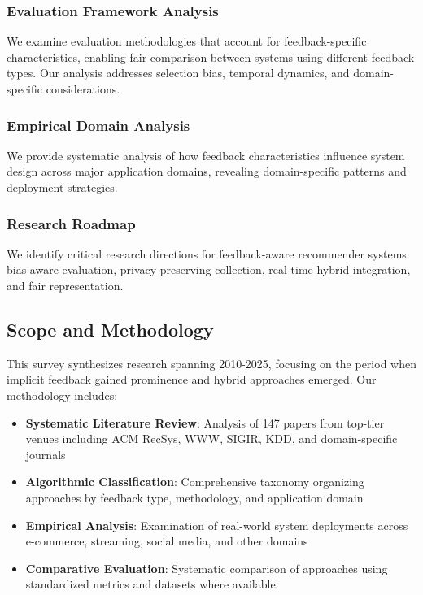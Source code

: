 \subsubsection{Evaluation Framework Analysis}
We examine evaluation methodologies that account for feedback-specific characteristics, enabling fair comparison between systems using different feedback types. Our analysis addresses selection bias, temporal dynamics, and domain-specific considerations.

\subsubsection{Empirical Domain Analysis}
We provide systematic analysis of how feedback characteristics influence system design across major application domains, revealing domain-specific patterns and deployment strategies.

\subsubsection{Research Roadmap}
We identify critical research directions for feedback-aware recommender systems: bias-aware evaluation, privacy-preserving collection, real-time hybrid integration, and fair representation.

\subsection{Scope and Methodology}

This survey synthesizes research spanning 2010-2025, focusing on the period when implicit feedback gained prominence and hybrid approaches emerged. Our methodology includes:

\begin{itemize}
    \item \textbf{Systematic Literature Review}: Analysis of 147 papers from top-tier venues including ACM RecSys, WWW, SIGIR, KDD, and domain-specific journals
    \item \textbf{Algorithmic Classification}: Comprehensive taxonomy organizing approaches by feedback type, methodology, and application domain
    \item \textbf{Empirical Analysis}: Examination of real-world system deployments across e-commerce, streaming, social media, and other domains
    \item \textbf{Comparative Evaluation}: Systematic comparison of approaches using standardized metrics and datasets where available
\end{itemize}

